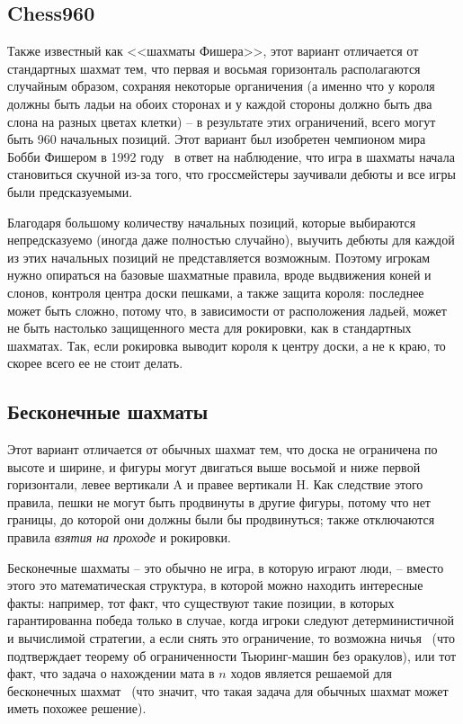 \documentclass{article}
\begin{document}
\subsection{Chess960}

Также известный как <<шахматы Фишера>>, этот вариант
отличается от стандартных шахмат тем, что первая и восьмая горизонталь располагаются случайным образом,
сохраняя некоторые органичения (а именно что у короля должны быть ладьи на обоих сторонах и у каждой стороны должно быть два слона на разных цветах клетки) --
в результате этих ограничений, всего могут быть 960 начальных позиций.
Этот вариант был изобретен чемпионом мира Бобби Фишером в 1992 году~\cite{chess960}
в ответ на наблюдение, что игра в шахматы начала становиться скучной
из-за того, что гроссмейстеры заучивали дебюты 
и все игры были предсказуемыми.

Благодаря большому количеству начальных позиций, 
которые выбираются непредсказуемо (иногда даже полностью случайно),
выучить дебюты для каждой из этих начальных позиций
не представляется возможным.
Поэтому игрокам нужно опираться на базовые шахматные правила,
вроде выдвижения коней и слонов, контроля центра доски пешками,
а также защита короля:
последнее может быть сложно, потому что, в зависимости от расположения ладьей,
может не быть настолько защищенного места для рокировки, как в стандартных шахматах.
Так, если рокировка выводит короля к центру доски, а не к краю, то скорее всего ее не стоит делать.

\subsection{Бесконечные шахматы}

Этот вариант отличается от обычных шахмат тем, 
что доска не ограничена по высоте и ширине,
и фигуры могут двигаться выше восьмой и ниже первой горизонтали,
левее вертикали A и правее вертикали H.
Как следствие этого правила, пешки не могут быть продвинуты в другие фигуры, потому что нет границы, до которой они должны были бы продвинуться;
также отключаются правила \emph{взятия на проходе} и рокировки.

Бесконечные шахматы -- это обычно не игра, в которую играют люди, --
вместо этого это математическая структура, в которой можно находить интересные факты:
например, тот факт, что существуют такие позиции,
в которых гарантированна победа только в случае, когда игроки следуют
детерминистичной и вычислимой стратегии, а если снять это ограничение, то возможна ничья~\cite{transfinite-game-values} 
(что подтверждает теорему об ограниченности Тьюринг-машин без оракулов),
или тот факт, что задача о нахождении мата в $n$ ходов 
является решаемой для бесконечных шахмат~\cite{infinite-mate-in-n}
(что значит, что такая задача для обычных шахмат может иметь похожее решение).
\end{document}
